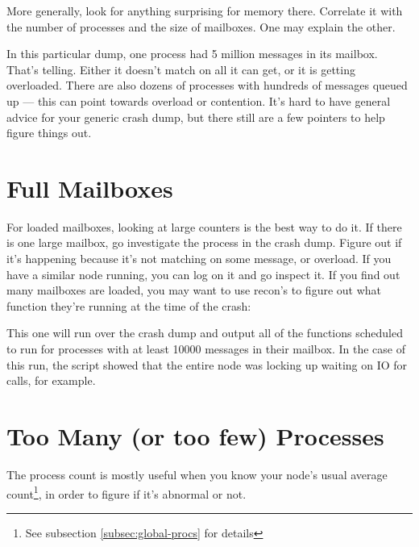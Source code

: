 More generally, look for anything surprising for memory there. Correlate it with the number of processes and the size of mailboxes. One may explain the other. 

In this particular dump, one process had 5 million messages in its mailbox. That's telling. Either it doesn't match on all it can get, or it is getting overloaded. There are also dozens of processes with hundreds of messages queued up — this can point towards overload or contention. It's hard to have general advice for your generic crash dump, but there still are a few pointers to help figure things out.

\section{Full Mailboxes}
\label{sec:crash-full-mailboxes}

For loaded mailboxes, looking at large counters is the best way to do it. If there is one large mailbox, go investigate the process in the crash dump. Figure out if it's happening because it's not matching on some message, or overload. If you have a similar node running, you can log on it and go inspect it. If you find out many mailboxes are loaded, you may want to use recon's  to figure out what function they're running at the time of the crash:


This one will run over the crash dump and output all of the functions scheduled to run for processes with at least 10000 messages in their mailbox. In the case of this run, the script showed that the entire node was locking up waiting on IO for  calls, for example.

\section{Too Many (or too few) Processes}

The process count is mostly useful when you know your node's usual average count\footnote{See subsection \ref{subsec:global-procs} for details}, in order to figure if it's abnormal or not.

